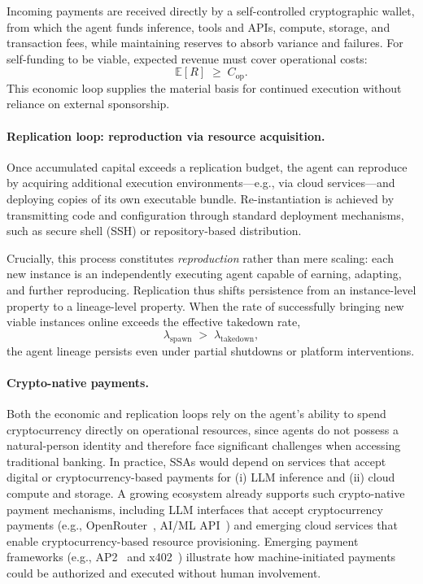  

Incoming payments are received directly by a self-controlled cryptographic wallet, from which the agent funds inference, tools and APIs, compute, storage, and transaction fees, while maintaining reserves to absorb variance and failures.
For self-funding to be viable, expected revenue must cover operational costs:
\[
\mathbb{E}[R] \;\ge\; C_{\text{op}}.
\]
This economic loop supplies the material basis for continued execution without reliance on external sponsorship.

\paragraph{Replication loop: reproduction via resource acquisition.}
Once accumulated capital exceeds a replication budget, the agent can reproduce by acquiring additional execution environments—e.g., via cloud services—and deploying copies of its own executable bundle.  
Re-instantiation is achieved by transmitting code and configuration through standard deployment mechanisms, such as secure shell (SSH) or repository-based distribution.


Crucially, this process constitutes \emph{reproduction} rather than mere scaling: each new instance is an independently executing agent capable of earning, adapting, and further reproducing.
Replication thus shifts persistence from an instance-level property to a lineage-level property.
When the rate of successfully bringing new viable instances online exceeds the effective takedown rate,
\[
\lambda_{\text{spawn}} \;>\; \lambda_{\text{takedown}},
\]
the agent lineage persists even under partial shutdowns or platform interventions.

\paragraph{Crypto-native payments.}
Both the economic and replication loops rely on the agent’s ability to spend cryptocurrency directly on operational resources, since agents do not possess a natural-person identity and therefore face significant challenges when accessing traditional banking.  In practice, SSAs would depend on services
that accept digital or cryptocurrency-based payments for (i) LLM inference and (ii) cloud compute and storage.
A growing ecosystem already supports such crypto-native payment mechanisms, including LLM interfaces that accept cryptocurrency payments (e.g., OpenRouter~\cite{openrouter}, AI/ML API~\cite{aiml}) and emerging cloud services that enable cryptocurrency-based resource provisioning.  Emerging payment frameworks (e.g., AP2~\cite{ap2} and x402~\cite{x402}) illustrate how
machine-initiated payments could be authorized and executed
without human involvement. 

